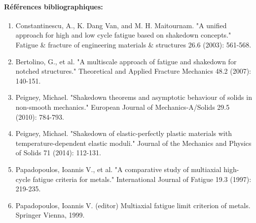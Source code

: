 \paragraph{Références bibliographiques:}
{\footnotesize
\begin{enumerate}

\item Constantinescu, A., K. Dang Van, and M. H. Maitournam. "A unified approach for high and low cycle fatigue based on shakedown concepts." Fatigue \& fracture of engineering materials \& structures 26.6 (2003): 561-568.

\item Bertolino, G., et al. "A multiscale approach of fatigue and shakedown for notched structures." Theoretical and Applied Fracture Mechanics 48.2 (2007): 140-151.

\item Peigney, Michael. "Shakedown theorems and asymptotic behaviour of solids in non-smooth mechanics." European Journal of Mechanics-A/Solids 29.5 (2010): 784-793.

\item Peigney, Michael. "Shakedown of elastic-perfectly plastic materials with temperature-dependent elastic 
moduli." Journal of the Mechanics and Physics of Solids 71 (2014): 112-131. 

\item Papadopoulos, Ioannis V., et al. "A comparative study of multiaxial high-cycle fatigue criteria for metals." International Journal of Fatigue 19.3 (1997): 219-235.

\item Papadopoulos, Ioannis V. (editor) Multiaxial fatigue limit criterion of metals. Springer Vienna, 1999.

\end{enumerate}
}
